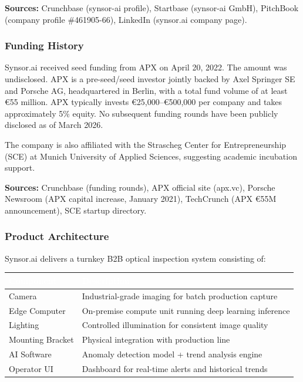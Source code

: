 \documentclass[11pt,letterpaper]{article}
\newcommand{\tableheader}[1]{\textbf{\sffamily\textcolor{white}{#1}}}
\begin{document}
\textbf{Sources:} Crunchbase (synsor-ai profile), Startbase (synsor-ai GmbH), PitchBook (company profile \#461905-66), LinkedIn (synsor.ai company page).

\subsubsection{Funding History}

Synsor.ai received seed funding from APX on April 20, 2022. The amount was undisclosed. APX is a pre-seed/seed investor jointly backed by Axel Springer SE and Porsche AG, headquartered in Berlin, with a total fund volume of at least \euro55 million. APX typically invests \euro25,000--\euro500,000 per company and takes approximately 5\% equity. No subsequent funding rounds have been publicly disclosed as of March 2026.

The company is also affiliated with the Strascheg Center for Entrepreneurship (SCE) at Munich University of Applied Sciences, suggesting academic incubation support.

\textbf{Sources:} Crunchbase (funding rounds), APX official site (apx.vc), Porsche Newsroom (APX capital increase, January 2021), TechCrunch (APX \euro55M announcement), SCE startup directory.

\subsubsection{Product Architecture}

Synsor.ai delivers a turnkey B2B optical inspection system consisting of:

\begin{center}
\begin{tabularx}{\textwidth}{L{3cm}X}
\toprule
{}
\tableheader{Component} & \tableheader{Description} \\
\midrule
Camera & Industrial-grade imaging for batch production capture \\
Edge Computer & On-premise compute unit running deep learning inference \\
Lighting & Controlled illumination for consistent image quality \\
Mounting Bracket & Physical integration with production line \\
AI Software & Anomaly detection model + trend analysis engine \\
Operator UI & Dashboard for real-time alerts and historical trends \\
\bottomrule
\end{tabularx}
\end{center}
\end{document}
